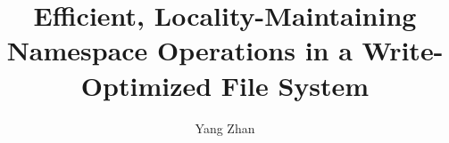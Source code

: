 \documentclass{article}
\begin{document}
\title{Efficient, Locality-Maintaining Namespace Operations in a Write-Optimized File System}
\author{Yang Zhan}
\date{}

\maketitle











\end{document}
